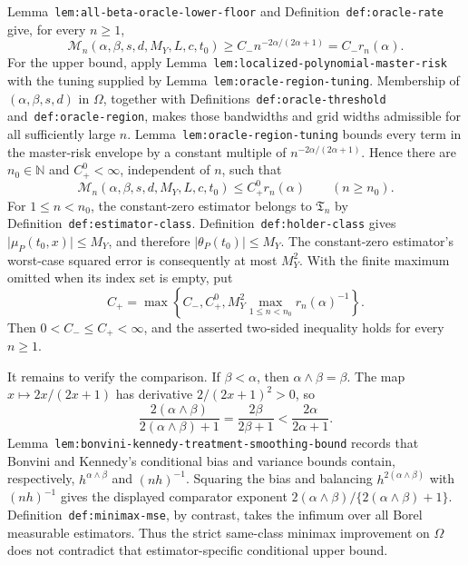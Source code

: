 Lemma~\texttt{lem:all-beta-oracle-lower-floor} and Definition~\texttt{def:oracle-rate} give, for every \(n\ge1\),
\[
\mathcal M_n(\alpha,\beta,s,d,M_Y,L,c,t_0)
\ge C_-n^{-2\alpha/(2\alpha+1)}=C_-r_n(\alpha).
\]
For the upper bound, apply Lemma~\texttt{lem:localized-polynomial-master-risk} with the tuning supplied by Lemma~\texttt{lem:oracle-region-tuning}. Membership of \((\alpha,\beta,s,d)\) in \(\Omega\), together with Definitions~\texttt{def:oracle-threshold} and~\texttt{def:oracle-region}, makes those bandwidths and grid widths admissible for all sufficiently large \(n\). Lemma~\texttt{lem:oracle-region-tuning} bounds every term in the master-risk envelope by a constant multiple of \(n^{-2\alpha/(2\alpha+1)}\). Hence there are \(n_0\in\mathbb N\) and \(C_+^0<\infty\), independent of \(n\), such that
\[
\mathcal M_n(\alpha,\beta,s,d,M_Y,L,c,t_0)
\le C_+^0r_n(\alpha)
\qquad(n\ge n_0).
\]
For \(1\le n<n_0\), the constant-zero estimator belongs to \(\mathfrak T_n\) by Definition~\texttt{def:estimator-class}. Definition~\texttt{def:holder-class} gives \(\lvert\mu_P(t_0,x)\rvert\le M_Y\), and therefore \(\lvert\theta_P(t_0)\rvert\le M_Y\). The constant-zero estimator's worst-case squared error is consequently at most \(M_Y^2\). With the finite maximum omitted when its index set is empty, put
\[
C_+=\max\left\{C_-,C_+^0,
M_Y^2\max_{1\le n<n_0}r_n(\alpha)^{-1}\right\}.
\]
Then \(0<C_-\le C_+<\infty\), and the asserted two-sided inequality holds for every \(n\ge1\).

It remains to verify the comparison. If \(\beta<\alpha\), then \(\alpha\wedge\beta=\beta\). The map \(x\mapsto2x/(2x+1)\) has derivative \(2/(2x+1)^2>0\), so
\[
\frac{2(\alpha\wedge\beta)}{2(\alpha\wedge\beta)+1}
=
\frac{2\beta}{2\beta+1}
<
\frac{2\alpha}{2\alpha+1}.
\]
Lemma~\texttt{lem:bonvini-kennedy-treatment-smoothing-bound} records that Bonvini and Kennedy's conditional bias and variance bounds contain, respectively, \(h^{\alpha\wedge\beta}\) and \((nh)^{-1}\). Squaring the bias and balancing \(h^{2(\alpha\wedge\beta)}\) with \((nh)^{-1}\) gives the displayed comparator exponent \(2(\alpha\wedge\beta)/\{2(\alpha\wedge\beta)+1\}\). Definition~\texttt{def:minimax-mse}, by contrast, takes the infimum over all Borel measurable estimators. Thus the strict same-class minimax improvement on \(\Omega\) does not contradict that estimator-specific conditional upper bound.